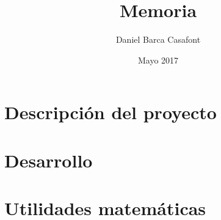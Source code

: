 \documentclass{report}
\title{Memoria}
\author{Daniel Barca Casafont}
\date{Mayo 2017}
\begin{document}
\begin{titlepage}
\maketitle
\end{titlepage}

\cleardoublepage
\tableofcontents


\cleardoublepage
\chapter{Descripción del proyecto}


\cleardoublepage
\chapter{Desarrollo}


\cleardoublepage
\appendix
\chapter{Utilidades matemáticas}

\end{document}
